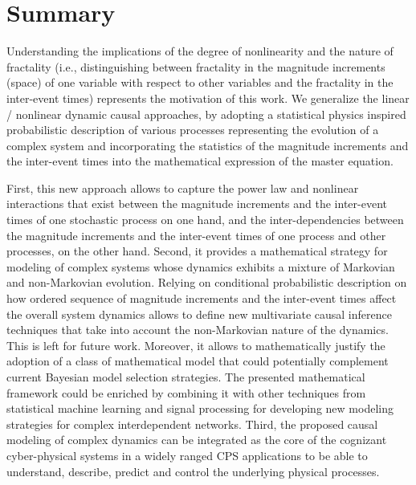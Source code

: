\section{Summary}
\label{Conclusion}
Understanding the implications of the degree of nonlinearity and the nature of fractality (i.e., distinguishing between fractality in the magnitude increments (space) of one variable with respect to other variables and the fractality in the inter-event times) represents the motivation of this work. We generalize the linear / nonlinear dynamic causal approaches, by adopting a statistical physics inspired probabilistic description of various processes representing the evolution of a complex system and incorporating the statistics of the magnitude increments and the inter-event times into the mathematical expression of the master equation. 

First, this new approach allows to capture the power law and nonlinear interactions that exist between the magnitude increments and the inter-event times of one stochastic process on one hand, and the inter-dependencies between the magnitude increments and the inter-event times of one process and other processes, on the other hand. Second, it provides a mathematical strategy for modeling of complex systems whose dynamics exhibits a mixture of Markovian and non-Markovian evolution. Relying on conditional probabilistic description on how ordered sequence of magnitude increments and the inter-event times affect the overall system dynamics allows to define new multivariate causal inference techniques that take into account the non-Markovian nature of the dynamics. This is left for future work. Moreover, it allows to mathematically justify the adoption of a class of mathematical model that could potentially complement current Bayesian model selection strategies. The presented mathematical framework could be enriched by combining it with other techniques from statistical machine learning and signal processing for developing new modeling strategies for complex interdependent networks. Third, the proposed causal modeling of complex dynamics can be integrated as the core of the cognizant cyber-physical systems in a widely ranged CPS applications to be able to understand, describe, predict and control the underlying physical processes.

